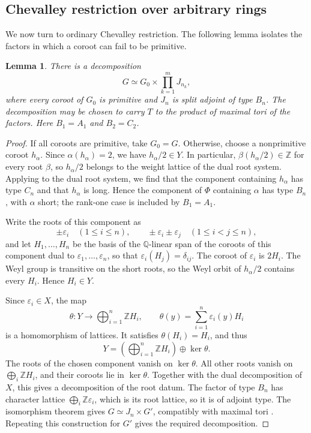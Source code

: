 \documentclass[twoside,a4paper,12pt,reqno]{amsart}
\newtheorem{lemma}[theorem]{Lemma}
\theoremstyle{remark}
\numberwithin{equation}{section}
\newcommand{\Z}{\mathbb Z}
\newcommand{\Q}{\mathbb Q}
\begin{document}
\subsection{Chevalley restriction over arbitrary rings}\label{subsec:chevalley-gluing}

We now turn to ordinary Chevalley restriction. The following lemma
isolates the factors in which a coroot can fail to be primitive.

\begin{lemma}\label{lem:split}
There is a decomposition
\[
G\simeq G_0\times\prod_{k=1}^m J_{n_k},
\]
where every coroot of \(G_0\) is primitive and \(J_n\) is split
adjoint of type \(B_n\). The decomposition may be chosen to carry
\(T\) to the product of maximal tori of the factors.
Here \(B_1=A_1\) and \(B_2=C_2\).
\end{lemma}
\begin{proof}
If all coroots are primitive, take \(G_0=G\). Otherwise, choose a
nonprimitive coroot \(h_\alpha\). Since \(\alpha(h_\alpha)=2\),
we have \(h_\alpha/2\in Y\). In particular,
\(\beta(h_\alpha/2)\in\Z\) for every root \(\beta\), so
\(h_\alpha/2\) belongs to the weight lattice of the dual root system.
Applying \cite[Lem.~1.4]{CR} to the dual root system, we find that
the component containing \(h_\alpha\) has type \(C_n\) and that
\(h_\alpha\) is long. Hence the component of \(\Phi\) containing
\(\alpha\) has type \(B_n\), with \(\alpha\) short; the rank-one
case is included by \(B_1=A_1\).

Write the roots of this component as
\[
\pm\varepsilon_i\quad(1\le i\le n),\qquad
\pm\varepsilon_i\pm\varepsilon_j\quad(1\le i<j\le n),
\]
and let \(H_1,\ldots,H_n\) be the basis of the \(\Q\)-linear span
of the coroots of this component dual to
\(\varepsilon_1,\ldots,\varepsilon_n\), so that
\(\varepsilon_i(H_j)=\delta_{ij}\).
The coroot of \(\varepsilon_i\) is \(2H_i\).
The Weyl group is transitive on the short roots, so the Weyl orbit
of \(h_\alpha/2\) contains every \(H_i\). Hence \(H_i\in Y\).

Since \(\varepsilon_i\in X\), the map
\[
\theta:Y\longrightarrow\bigoplus_{i=1}^n\Z H_i,\qquad
\theta(y)=\sum_{i=1}^n\varepsilon_i(y)H_i
\]
is a homomorphism of lattices. It satisfies \(\theta(H_i)=H_i\), and thus
\[
Y=\left(\bigoplus_{i=1}^n\Z H_i\right)\oplus\ker\theta.
\]
The roots of the chosen component vanish on \(\ker\theta\).
All other roots vanish on \(\bigoplus_i\Z H_i\), and their coroots
lie in \(\ker\theta\). Together with the dual decomposition of \(X\),
this gives a decomposition of the root datum.
The factor of type \(B_n\) has character lattice
\(\bigoplus_i\Z\varepsilon_i\), which is its root lattice, so it is of adjoint type.
The isomorphism theorem gives \(G\simeq J_n\times G'\), compatibly
with maximal tori \cite[Thm.~6.1.17]{Conrad}.
Repeating this construction for \(G'\) gives the required decomposition.
\end{proof}
\end{document}
